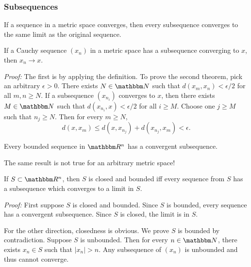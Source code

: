 \documentclass[9pt,aspectratio=169]{beamer}
\newcommand{\RR}{\mathbbm R}
\newcommand{\NN}{\mathbbm N}
\begin{document}
\begin{frame}[allowframebreaks]
    \frametitle{Subsequences}
    \begin{theorem}
        If a sequence in a metric space converges, then every subsequence
        converges to the same limit as the original sequence.
    \end{theorem}
    \begin{theorem}
        If a Cauchy sequence $(x_n)$ in a metric space has a subsequence
        converging to $x$, then $x_n \to x$.
    \end{theorem}
    \emph{Proof:} The first is by applying the definition. To prove the
    second theorem, pick an arbitrary $\epsilon > 0$. There exists $N \in
    \NN$ such that $d(x_m, x_n) < \epsilon/2$ for all $m, n \geq N$. If a
    subsequence $(x_{n_i})$ converges to $x$, then there exists $M \in \NN$
    such that $d(x_{n_i}, x) < \epsilon/2$ for all $i \geq M$. Choose one
    $j\geq M$ such that $n_j\geq N$. Then for every $m\geq N$,
    \begin{equation*}
        d(x, x_m) \leq d(x, x_{n_j}) + d(x_{n_j}, x_m) < \epsilon.
    \end{equation*}
    \framebreak
    \begin{theorem}
        Every bounded sequence in $\RR^n$ has a convergent subsequence.
    \end{theorem}
    The same result is not true for an arbitrary metric space!

    \begin{corollary}
        If $S \subset \RR^n$, then $S$ is closed and bounded iff every
        sequence from $S$ has a subsequence which converges to a limit in
        $S$.
    \end{corollary}
    \emph{Proof:} First suppose $S$ is closed and bounded. Since $S$ is
    bounded, every sequence has a convergent subsequence. Since $S$ is
    closed, the limit is in $S$.

    For the other direction, closedness is obvious. We prove $S$ is bounded
    by contradiction. Suppose $S$ is unbounded. Then for every $n \in \NN$,
    there exists $x_n \in S$ such that $|x_n| > n$. Any subsequence of
    $(x_n)$ is unbounded and thus cannot converge.
\end{frame}
\end{document}
